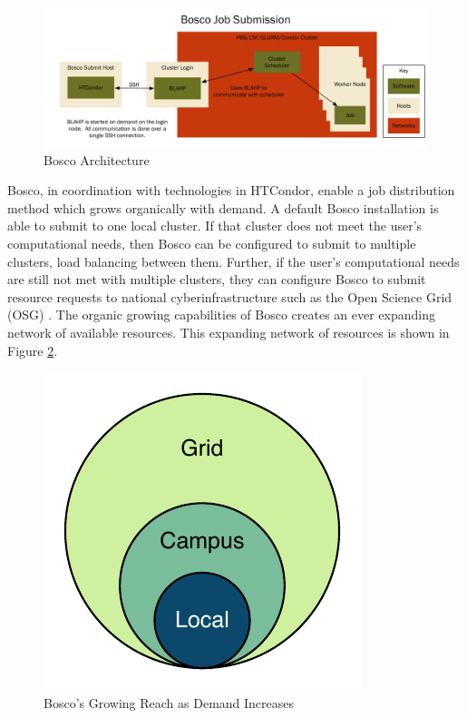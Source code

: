 \begin{figure}[ht!]
	\centering
	\includegraphics[width=\textwidth]{images/ArchitectureGraph1.pdf}
	\caption{Bosco Architecture}
	\label{fig:introboscoarch}
\end{figure}

Bosco, in coordination with technologies in HTCondor, enable a job distribution method which grows organically with demand.  A default Bosco installation is able to submit to one local cluster.  If that cluster does not meet the user's computational needs, then Bosco can be configured to submit to multiple clusters, load balancing between them.  Further, if the user's computational needs are still not met with multiple clusters, they can configure Bosco to submit resource requests to national cyberinfrastructure such as the Open Science Grid (OSG) \cite{pordes2007open}.  The organic growing capabilities of Bosco creates an ever expanding network of available resources. This expanding network of resources is shown in Figure \ref{fig:boscogrowing}.

\begin{figure}[ht!]
	\centering
	\includegraphics{images/BoscoGrowing.pdf}
	\caption{Bosco's Growing Reach as Demand Increases}
	\label{fig:boscogrowing}
\end{figure}

